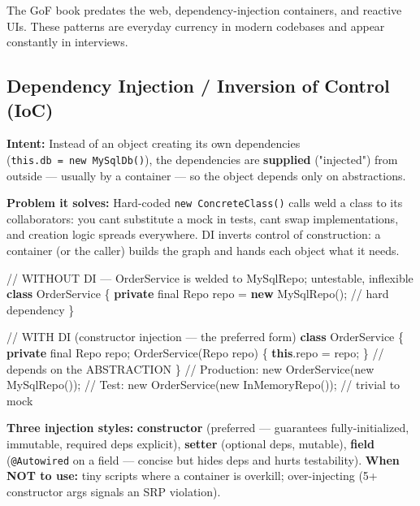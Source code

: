 \documentclass[11pt]{article}
\newenvironment{Shaded}{\begin{snugshade}}{\end{snugshade}}
\newcommand{\CommentTok}[1]{\textcolor[rgb]{0.48,0.49,0.49}{#1}}
\newcommand{\DataTypeTok}[1]{\textcolor[rgb]{0.16,0.50,0.73}{#1}}
\newcommand{\FunctionTok}[1]{\textcolor[rgb]{0.56,0.27,0.68}{#1}}
\newcommand{\KeywordTok}[1]{\textcolor[rgb]{0.81,0.81,0.76}{\textbf{#1}}}
\newcommand{\NormalTok}[1]{\textcolor[rgb]{0.81,0.81,0.76}{#1}}
\newcommand{\OperatorTok}[1]{\textcolor[rgb]{0.81,0.81,0.76}{#1}}
\begin{document}
The GoF book predates the web, dependency-injection containers, and reactive UIs. These patterns are everyday currency in modern codebases and appear constantly in interviews.

\subsection{Dependency Injection / Inversion of Control (IoC)}\label{dependency-injection--inversion-of-control-ioc}

\textbf{Intent:} Instead of an object creating its own dependencies (\texttt{this.db\ =\ new\ MySqlDb()}), the dependencies are \textbf{supplied} ("injected") from outside --- usually by a container --- so the object depends only on abstractions.

\textbf{Problem it solves:} Hard-coded \texttt{new\ ConcreteClass()} calls weld a class to its collaborators: you can\textquotesingle t substitute a mock in tests, can\textquotesingle t swap implementations, and creation logic spreads everywhere. DI inverts control of construction: a container (or the caller) builds the graph and hands each object what it needs.


\begin{Shaded}
\begin{Highlighting}[]
\CommentTok{// WITHOUT DI — OrderService is welded to MySqlRepo; untestable, inflexible}
\KeywordTok{class}\NormalTok{ OrderService }\OperatorTok{\{}
    \KeywordTok{private} \DataTypeTok{final}\NormalTok{ Repo repo }\OperatorTok{=} \KeywordTok{new} \FunctionTok{MySqlRepo}\OperatorTok{();}   \CommentTok{// hard dependency}
\OperatorTok{\}}

\CommentTok{// WITH DI (constructor injection — the preferred form)}
\KeywordTok{class}\NormalTok{ OrderService }\OperatorTok{\{}
    \KeywordTok{private} \DataTypeTok{final}\NormalTok{ Repo repo}\OperatorTok{;}
    \FunctionTok{OrderService}\OperatorTok{(}\NormalTok{Repo repo}\OperatorTok{)} \OperatorTok{\{} \KeywordTok{this}\OperatorTok{.}\FunctionTok{repo} \OperatorTok{=}\NormalTok{ repo}\OperatorTok{;} \OperatorTok{\}} \CommentTok{// depends on the ABSTRACTION}
\OperatorTok{\}}
\CommentTok{// Production: new OrderService(new MySqlRepo());}
\CommentTok{// Test:       new OrderService(new InMemoryRepo());   // trivial to mock}
\end{Highlighting}
\end{Shaded}

\textbf{Three injection styles:} \textbf{constructor} (preferred --- guarantees fully-initialized, immutable, required deps explicit), \textbf{setter} (optional deps, mutable), \textbf{field} (\texttt{@Autowired} on a field --- concise but hides deps and hurts testability). \textbf{When NOT to use:} tiny scripts where a container is overkill; over-injecting (5+ constructor args signals an SRP violation).
\end{document}
